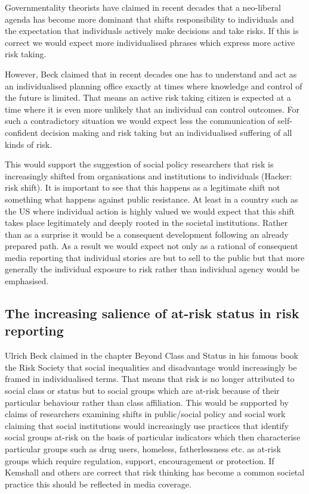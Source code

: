 \documentclass{report}
\begin{document}
Governmentality theorists have claimed in recent decades that a neo-liberal agenda has become more dominant that shifts responsibility to individuals and the expectation that individuals actively make decisions and take risks. If this is correct we would expect more individualised phrases which express more active risk taking. 

However, Beck claimed that in recent decades one has to understand and act as an individualised planning office exactly at times where knowledge and control of the future is limited. That means an active risk taking citizen is expected at a time where it is even more unlikely that an individual can control outcomes. For such a contradictory situation we would expect less the communication of self-confident decision making and risk taking but an individualised suffering of all kinds of risk. 

This would support the suggestion of social policy researchers that risk is increasingly shifted from organisations and institutions to individuals (Hacker: risk shift). It is important to see that this happens as a legitimate shift not something what happens against public resistance. At least in a country such as the US where individual action is highly valued we would expect that this shift takes place legitimately and deeply rooted in the societal institutions. Rather than as a surprise it would be a consequent development following an already prepared path. As a result we would expect not only as a rational of consequent media reporting that individual stories are but to sell to the public but that more generally the individual exposure to risk rather than individual agency would be emphasised. 

\subsection*{The increasing salience of at-risk status in risk reporting}

Ulrich Beck claimed in the chapter Beyond Class and Status in his famous book the Risk Society that social inequalities and disadvantage would increasingly be framed in individualised terms. That means that risk is no longer attributed to social class or status but to social groups which are at-risk because of their particular behaviour rather than class affiliation. 
This would be supported by claims of researchers examining shifts in public\slash social policy and social work claiming that social institutions would increasingly use practices that identify social groups at-risk on the basis of particular indicators which then characterise particular groups such as drug users, homeless, fatherlessness etc. as at-risk groups which require regulation, support, encouragement or protection. If Kemshall and others are correct that risk thinking has become a common societal practice this should be reflected in media coverage.
\end{document}
